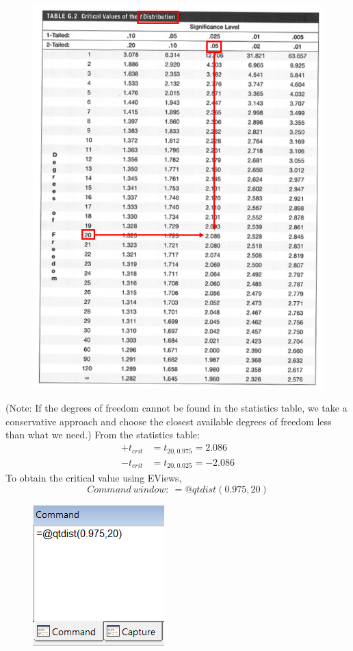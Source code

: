 \documentclass[12pt]{report}
\begin{document}
\begin{figure}[H]
	\centering
	\includegraphics{tute6_q1_4}
\end{figure}
\vspace{-\baselineskip} \noindent (Note: If the degrees of freedom cannot be found in the statistics table, we take a conservative approach and choose the closest available degrees of freedom less than what we need.)
\noindent From the statistics table: \begin{align*}
	+t_{crit} &= t_{20,0.975} = 2.086 \\
	-t_{crit} &= t_{20,0.025} = -2.086
\end{align*}
\noindent To obtain the critical value using EViews,
$$Command\ window:\ =@qtdist(0.975,20)$$
\begin{figure}[H]
	\centering
	\includegraphics{tute6_q1_5}
\end{figure}
\end{document}
